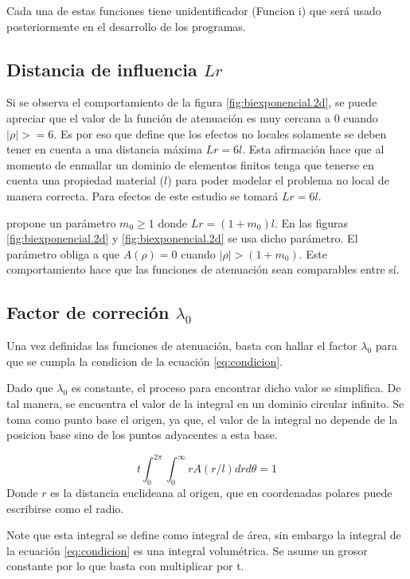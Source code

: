 Cada una de estas funciones tiene unidentificador (Funcion i) que será usado posteriormente en el desarrollo de los programas.
\subsection{Distancia de influencia \texorpdfstring{$Lr$}{Lr}}

Si se observa el comportamiento de la figura \ref{fig:biexponencial.2d}, se puede apreciar que el valor de la función de atenuación es muy cercana a 0 cuando $|\rho|>=6$. Es por eso que \textcite{Polizzotto2001} define que los efectos no locales solamente se deben tener en cuenta a una distancia máxima $Lr=6l$. Esta afirmación hace que al momento de enmallar un dominio de elementos finitos tenga que tenerse en cuenta una propiedad material ($l$) para poder modelar el problema no local de manera correcta. Para efectos de este estudio se tomará $Lr=6l$. 

\textcite{Polizzotto2001} propone un parámetro $m_0\geq1$ donde $Lr=(1+m_0)l$. En las figuras \ref{fig:biexponencial.2d} y \ref{fig:biexponencial.2d} se usa dicho parámetro. El parámetro obliga a que $A(\rho)=0$ cuando $|\rho|>(1+m_0)$. Este comportamiento hace que las funciones de atenuación sean comparables entre sí.

\subsection{Factor de correción \texorpdfstring{$\lambda_0$}{λ0}}

Una vez definidas las funciones de atenuación, basta con hallar el factor $\lambda_0$ para que se cumpla la condicion de la ecuación \ref{eq:condicion}.

Dado que $\lambda_0$ es constante, el proceso para encontrar dicho valor se simplifica. De tal manera, se encuentra el valor de la integral en un dominio circular infinito. Se toma como punto base el origen, ya que, el valor de la integral no depende de la posicion base sino de los puntos adyacentes a esta base.

\begin{equation}
	t\int_{0}^{2\pi}\int_{0}^{\infty}{rA(r/l)}{dr}{d\theta}=1
\end{equation} 
Donde $r$ es la distancia euclideana al origen, que en coordenadas polares puede escribirse como el radio.

Note que esta integral se define como integral de área, sin embargo la integral de la ecuación \ref{eq:condicion} es una integral volumétrica. Se asume un grosor constante por lo que basta con multiplicar por t.

